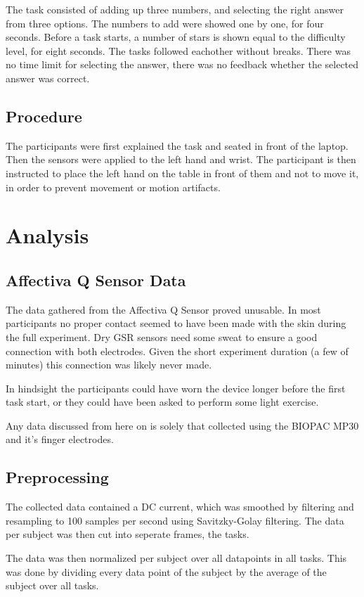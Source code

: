 \documentclass[12pt,leqno,letterpaper]{report} %
\begin{document}
The task consisted of adding up three numbers, and selecting the right answer from three options. The numbers to add were showed one by one, for four seconds. Before a task starts, a number of stars is shown equal to the difficulty level, for eight seconds. The tasks followed eachother without breaks. There was no time limit for selecting the answer, there was no feedback whether the selected answer was correct.


\subsection{Procedure}
The participants were first explained the task and seated in front of the laptop. Then the sensors were applied to the left hand and wrist. The participant is then instructed to place the left hand on the table in front of them and not to move it, in order to prevent movement or motion artifacts.

\section{Analysis}

\subsection{Affectiva Q Sensor Data}
The data gathered from the Affectiva Q Sensor proved unusable. In most participants no proper contact seemed to have been made with the skin during the full experiment. Dry GSR sensors need some sweat to ensure a good connection with both electrodes. Given the short experiment duration (a few of minutes) this connection was likely never made.

In hindsight the participants could have worn the device longer before the first task start, or they could have been asked to perform some light exercise. 

Any data discussed from here on is solely that collected using the BIOPAC MP30 and it's finger electrodes.


\subsection{Preprocessing}
The collected data contained a DC current, which was smoothed by filtering and resampling to 100 samples per second using Savitzky-Golay filtering. 
The data per subject was then cut into seperate frames, the tasks. 

The data was then normalized per subject over all datapoints in all tasks. This was done by dividing every data point of the subject by the average of the subject over all tasks. 
\end{document}
